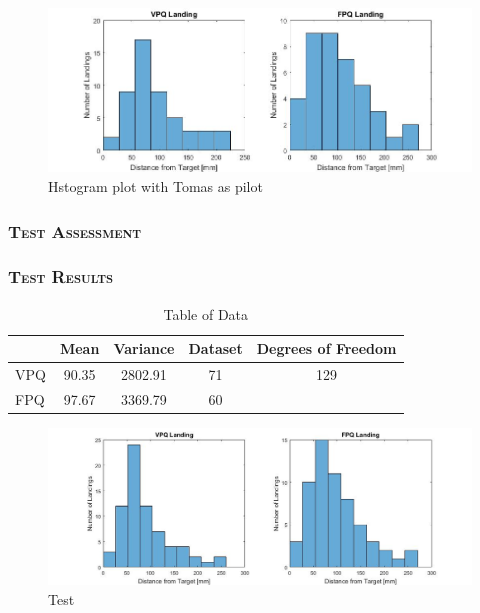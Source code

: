 \begin{figure}[H]
    \centering
    \includegraphics[width = 1\textwidth]{VAPIQ-PICTURES/histotomas}
    \caption{Hstogram plot with Tomas as pilot}
    \label{fig:landsetup}
\end{figure}

\subsubsection*{\textsc{\medium Test Assessment}}
\subsubsection*{\textsc{\medium Test Results}}


\begin{table}[H]
\caption{Table of Data}
\label{tab:landingdata}
\centering
\begin{tabular}{ l| c c c c} 
     & Mean & Variance & Dataset & Degrees of Freedom\\
 \hline
VPQ & 90.35 & 2802.91   & 71        & 129\\
FPQ & 97.67 & 3369.79   & 60\\
\end{tabular}
\end{table}


\begin{figure}[H]
    \centering
    \includegraphics[width = 1\textwidth]{VAPIQ-PICTURES/histoall}
    \caption{Test}
    \label{fig:landsetup}
\end{figure}

